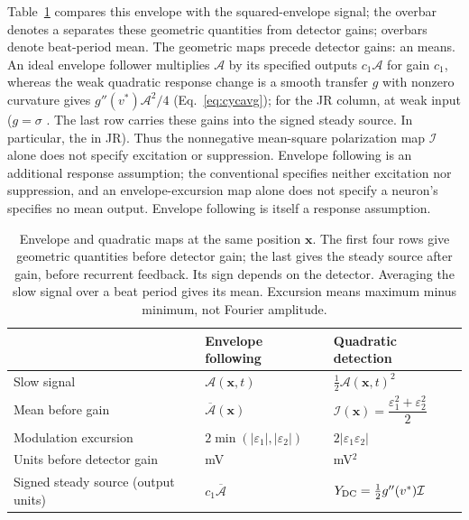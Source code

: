 \documentclass[11pt,a4paper]{article}
\newcommand{\Sig}{\sigma}
\providecommand{\DIFaddtex}[1]{{\protect\color{blue} \sf #1}} %
\providecommand{\DIFdeltex}[1]{{\protect\color{red} \scriptsize #1}} %
\providecommand{\DIFaddbegin}{} %
\providecommand{\DIFaddend}{} %
\providecommand{\DIFdelbegin}{} %
\providecommand{\DIFdelend}{} %
\providecommand{\DIFadd}[1]{\texorpdfstring{\DIFaddtex{#1}}{#1}} %
\providecommand{\DIFdel}[1]{\texorpdfstring{\DIFdeltex{#1}}{}} %
\begin{document}
\DIFaddend Table~\ref{tab:transduction-maps} \DIFdelbegin \DIFdel{compares this envelope with the squared-envelope
signal; the overbar denotes a }\DIFdelend \DIFaddbegin \DIFadd{separates these geometric quantities from
detector gains; overbars denote }\DIFaddend beat-period \DIFdelbegin \DIFdel{mean. The geometric maps precede detector gains: an }\DIFdelend \DIFaddbegin \DIFadd{means. An }\DIFaddend ideal envelope follower
\DIFdelbegin \DIFdel{multiplies $\mathcal A$ by its specified }\DIFdelend \DIFaddbegin \DIFadd{outputs $c_1\mathcal A$ for }\DIFaddend gain $c_1$, whereas \DIFdelbegin \DIFdel{the weak quadratic response change is }\DIFdelend \DIFaddbegin \DIFadd{a smooth transfer $g$ with
nonzero curvature gives }\DIFaddend $g''(v^*)\mathcal A^2/4$ \DIFdelbegin \DIFdel{(Eq.~\eqref{eq:cycavg}); for the JR column, }\DIFdelend \DIFaddbegin \DIFadd{at weak input (}\DIFaddend $g=\Sig$ \DIFdelbegin \DIFdel{.
The last row carries these gains into the signed steady source. In particular,
the }\DIFdelend \DIFaddbegin \DIFadd{in JR).
Thus the }\DIFaddend nonnegative mean-square \DIFdelbegin \DIFdel{polarization }\DIFdelend \DIFaddbegin \DIFadd{map }\DIFaddend $\mathcal I$ \DIFdelbegin \DIFdel{alone does not specify
excitation
or suppression.
Envelope following is an additional response assumption; the conventional
}\DIFdelend \DIFaddbegin \DIFadd{specifies neither excitation
nor suppression, and an }\DIFaddend envelope-excursion map alone \DIFdelbegin \DIFdel{does not specify a neuron's }\DIFdelend \DIFaddbegin \DIFadd{specifies no }\DIFaddend mean output.
\DIFaddbegin \DIFadd{Envelope following is itself a response assumption.
}\DIFaddend

\begin{table}[ht]
\centering\small
\renewcommand{\arraystretch}{1.4}
\begin{tabular}{@{}>{\raggedright\arraybackslash}p{}
 >{\raggedright\arraybackslash}p{}
 >{\raggedright\arraybackslash}p{}@{}}
\toprule
 & Envelope following & Quadratic detection \\
\midrule
Slow signal & $\mathcal A(\mathbf x,t)$ & $\tfrac12\mathcal A(\mathbf x,t)^2$ \\
Mean before gain & $\overline{\mathcal A}(\mathbf x)$
 & $\mathcal I(\mathbf x)=\dfrac{\varepsilon_1^2+\varepsilon_2^2}{2}$ \\
Modulation excursion & $2\min(|\varepsilon_1|,|\varepsilon_2|)$
 & $2|\varepsilon_1\varepsilon_2|$ \\
Units before detector gain & mV & mV$^2$ \\
Signed steady source (output units) & $c_1\overline{\mathcal A}$
 & $Y_{\rm DC}=\tfrac12g''(v^*)\mathcal I$ \\
\bottomrule
\end{tabular}
\caption{Envelope and quadratic maps at the same position $\mathbf x$.
The first four rows give geometric quantities before detector gain; the last
gives the steady source after gain, before recurrent feedback. Its sign depends
on the detector. Averaging the slow signal over a beat period gives its mean.
Excursion means maximum minus minimum, not Fourier amplitude.}
\label{tab:transduction-maps}
\end{table}
\end{document}
